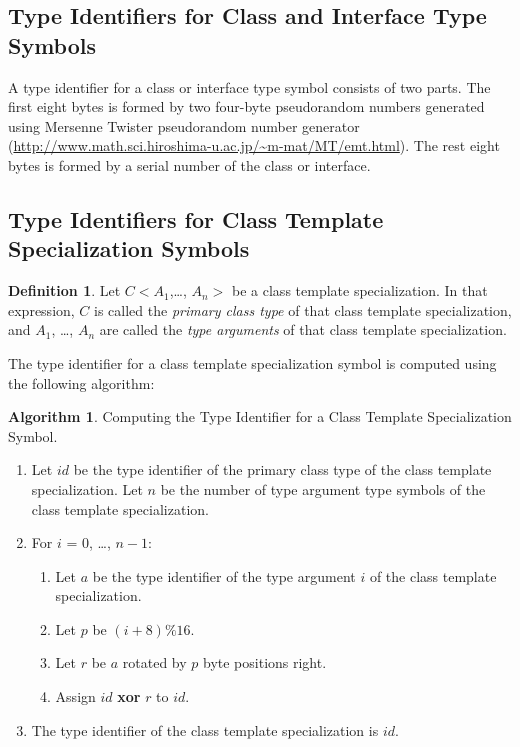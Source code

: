 \documentclass[a4paper,oneside,11pt]{book}
\theoremstyle{definition}
\newtheorem{algo}{Algorithm}[section]
\newtheorem{defn}{Definition}[section]
\begin{document}
\clearpage
\subsection{Type Identifiers for Class and Interface Type Symbols}

A type identifier for a class or interface type symbol consists of two parts.
The first eight bytes is formed by two four-byte pseudorandom numbers generated using Mersenne Twister pseudorandom number generator
(\url{http://www.math.sci.hiroshima-u.ac.jp/~m-mat/MT/emt.html}).
The rest eight bytes is formed by a serial number of the class or interface.

\subsection{Type Identifiers for Class Template Specialization Symbols}

\begin{defn}\label{primaryclasstype} Let $C<A_1$,\ldots, $A_n>$ be a class template specialization.
In that expression, $C$ is called the \emph{primary class type} of that class template specialization,
and $A_1$, \ldots, $A_n$ are called the \emph{type arguments} of that class template specialization.
\end{defn}

The type identifier for a class template specialization symbol is computed using the following algorithm:

\begin{algo}\label{templatetypeid} Computing the Type Identifier for a Class Template Specialization Symbol.
\begin{enumerate}
\item
Let $id$ be the type identifier of the primary class type of the class template specialization.
Let $n$ be the number of type argument type symbols of the class template specialization.
\item
For $i$ = 0, \ldots, $n - 1$:
\begin{enumerate}
\item
Let $a$ be the type identifier of the type argument $i$ of the class template specialization.
\item
Let $p$ be $(i + 8) \% 16$.
\item
Let $r$ be $a$ rotated by $p$ byte positions right.
\item
Assign $id$ \textbf{xor} $r$ to $id$.
\end{enumerate}
\item
The type identifier of the class template specialization is $id$.
\end{enumerate}
\end{algo}
\end{document}
